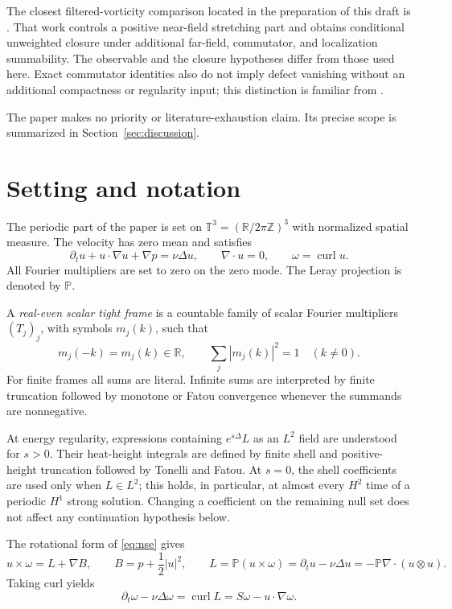 \documentclass[11pt]{article}
\theoremstyle{definition}
\newcommand{\Torus}{\mathbb T^3}
\newcommand{\R}{\mathbb R}
\newcommand{\Pp}{\mathbb P}
\newcommand{\curl}{\operatorname{curl}}
\newcommand{\abs}[1]{\left\lvert #1\right\rvert}
\begin{document}
The closest filtered-vorticity comparison located in the preparation of this
draft is \citet{Yu2026}.  That work controls a positive near-field stretching
part and obtains conditional unweighted closure under additional far-field,
commutator, and localization summability.  The observable and the closure
hypotheses differ from those used here.  Exact commutator identities also do
not imply defect vanishing without an additional compactness or regularity
input; this distinction is familiar from \citet{DuchonRobert2000}.

The paper makes no priority or literature-exhaustion claim.  Its precise
scope is summarized in Section~\ref{sec:discussion}.

\section{Setting and notation}\label{sec:setting}

The periodic part of the paper is set on
\(\Torus=(\R/2\pi\mathbb Z)^3\) with normalized spatial measure.  The
velocity has zero mean and satisfies
\begin{equation}\label{eq:nse}
 \partial_tu+u\cdot\nabla u+\nabla p=\nu\Delta u,
 \qquad \nabla\cdot u=0,
 \qquad \omega=\curl u.
\end{equation}
All Fourier multipliers are set to zero on the zero mode.  The Leray
projection is denoted by \(\Pp\).

A \emph{real-even scalar tight frame} is a countable family of scalar
Fourier multipliers \((T_j)_j\), with symbols \(m_j(k)\), such that
\begin{equation}\label{eq:tight}
 m_j(-k)=m_j(k)\in\R,
 \qquad \sum_j\abs{m_j(k)}^2=1
 \quad (k\ne0).
\end{equation}
For finite frames all sums are literal.  Infinite sums are interpreted by
finite truncation followed by monotone or Fatou convergence whenever the
summands are nonnegative.

At energy regularity, expressions containing \(e^{s\Delta}L\) as an
\(L^2\) field are understood for \(s>0\).  Their heat-height integrals are
defined by finite shell and positive-height truncation followed by Tonelli
and Fatou.  At \(s=0\), the shell coefficients are used only when
\(L\in L^2\); this holds, in particular, at almost every \(H^2\) time of a
periodic \(H^1\) strong solution.  Changing a coefficient on the remaining
null set does not affect any continuation hypothesis below.

The rotational form of \eqref{eq:nse} gives
\begin{equation}\label{eq:lamb}
 u\times\omega=L+\nabla B,
 \qquad
 B=p+\frac12\abs{u}^2,
 \qquad
 L=\Pp(u\times\omega)
   =\partial_tu-\nu\Delta u
   =-\Pp\nabla\cdot(u\otimes u).
\end{equation}
Taking curl yields
\begin{equation}\label{eq:vort-lamb}
 \partial_t\omega-\nu\Delta\omega
 =\curl L=S\omega-u\cdot\nabla\omega.
\end{equation}
\end{document}
